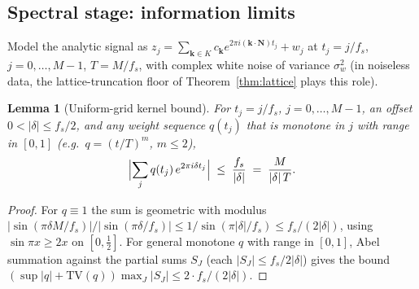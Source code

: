\documentclass[twocolumn,preprintnumbers,amsmath,amssymb,pra,floatfix]{revtex4-2}
\newcommand{\vect}[1]{\bm{#1}}
\newtheorem{lemma}{Lemma}
\begin{document}
\subsection{Spectral stage: information limits}

Model the analytic signal as
$z_j=\sum_{\vect{k}\in K}c_{\vect{k}}
e^{2\pi i(\vect{k}\cdot\vect{N})t_j}+w_j$ at $t_j=j/f_s$,
$j=0,\dots,M{-}1$, $T=M/f_s$, with complex white noise of variance
$\sigma_w^{2}$ (in noiseless data, the lattice-truncation floor of
Theorem~\ref{thm:lattice} plays this role).

\begin{lemma}[Uniform-grid kernel bound]
\label{lem:kernel}
For $t_j=j/f_s$, $j=0,\dots,M{-}1$, an offset $0<|\delta|\le f_s/2$,
and any weight sequence $q(t_j)$ that is monotone in $j$ with range
in $[0,1]$ (e.g.\ $q=(t/T)^{m}$, $m\le2$),
\begin{equation}
  \Bigl|\sum_{j} q(t_j)\,e^{2\pi i\delta t_j}\Bigr|
  \;\le\;\frac{f_s}{|\delta|}
  \;=\;\frac{M}{|\delta|\,T}.
  \label{eq:kernel}
\end{equation}
\end{lemma}
\begin{proof}
For $q\equiv1$ the sum is geometric with modulus
$|\sin(\pi\delta M/f_s)|/|\sin(\pi\delta/f_s)|
\le1/\sin(\pi|\delta|/f_s)\le f_s/(2|\delta|)$, using
$\sin\pi x\ge2x$ on $[0,\tfrac12]$.  For general monotone $q$ with
range in $[0,1]$, Abel summation against the partial sums $S_J$
(each $|S_J|\le f_s/2|\delta|$) gives the bound
$(\sup|q|+\mathrm{TV}(q))\max_J|S_J|\le2\cdot f_s/(2|\delta|)$.
\end{proof}
\end{document}
